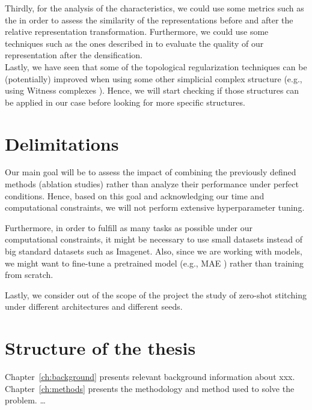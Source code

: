 \documentclass[../main.tex]{subfiles}
\begin{document}
Thirdly, for the analysis of the characteristics, we could use some metrics such as the   \cite{kornblith_similarity_2019} in order to assess the similarity of the representations before and after the relative representation transformation. Furthermore, we could use some techniques such as the ones described in \cite{poklukar_learning_2022} to evaluate the quality of our representation after the densification.\\

Lastly, we have seen that some of the topological regularization techniques can be (potentially) improved when using some other simplicial complex structure (e.g., using Witness complexes \cite{schonenberger_witness_2022}). Hence, we will start checking if those structures can be applied in our case before looking for more specific structures.

\section{Delimitations}

Our main goal will be to assess the impact of combining the previously defined methods (ablation studies) rather than analyze their performance under perfect conditions. Hence, based on this goal and acknowledging our time and computational constraints, we will not perform extensive hyperparameter tuning. 


Furthermore, in order to fulfill as many tasks as possible under our computational constraints, it might be necessary to use small datasets instead of big standard datasets such as Imagenet. Also, since we are working with  models, we might want to fine-tune a pretrained model (e.g., MAE \cite{he_masked_2021}) rather than training from scratch.

Lastly, we consider out of the scope of the project the study of zero-shot stitching under different architectures and different seeds.


\section{Structure of the thesis}
Chapter~\ref{ch:background} presents relevant background information about xxx.  Chapter~\ref{ch:methods} presents the methodology and method used to solve the problem. …
\end{document}
